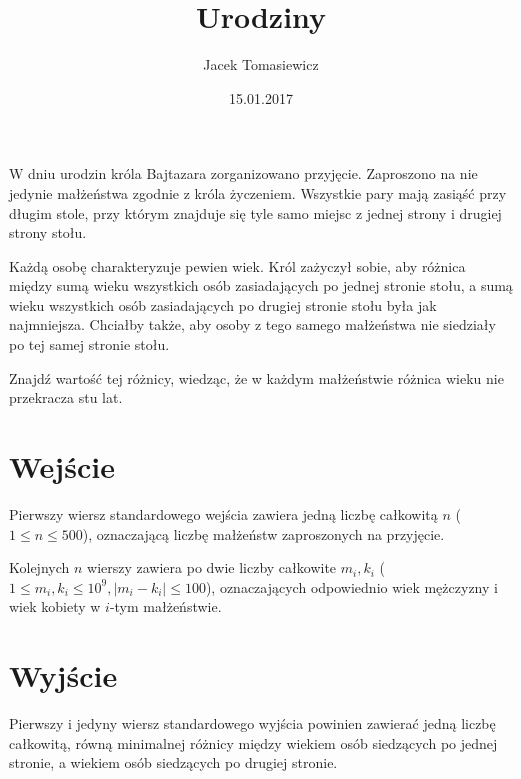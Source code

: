 \documentclass[zad,zawodnik, utf8]{sinol}
\title{Urodziny}
\author{Jacek Tomasiewicz}
\date{15.01.2017}
\begin{document}
  \begin{tasktext}%
W dniu urodzin króla Bajtazara zorganizowano przyjęcie. Zaproszono na nie jedynie małżeństwa zgodnie z króla życzeniem. Wszystkie pary mają zasiąść przy długim stole, przy którym znajduje się tyle samo miejsc z jednej strony i drugiej strony stołu. 

Każdą osobę charakteryzuje pewien wiek. Król zażyczył sobie, aby różnica między sumą wieku wszystkich osób zasiadających po jednej stronie stołu, a sumą wieku wszystkich osób zasiadających po drugiej stronie stołu była jak najmniejsza. Chciałby także, aby osoby z tego samego małżeństwa nie siedziały po tej samej stronie stołu. 

Znajdź wartość tej różnicy, wiedząc, że w każdym małżeństwie różnica wieku nie przekracza stu lat. 

  \section{Wejście}
Pierwszy wiersz standardowego wejścia zawiera jedną liczbę całkowitą $n$ ($1 \leq n \leq 500$), oznaczającą liczbę małżeństw zaproszonych na przyjęcie. 

Kolejnych $n$ wierszy zawiera po dwie liczby całkowite $m_i, k_i$ ($1\leq m_i, k_i \leq 10^9, |m_i-k_i| \leq 100$), oznaczających odpowiednio wiek mężczyzny i wiek kobiety w $i$-tym małżeństwie.

  \section{Wyjście}
	
Pierwszy i jedyny wiersz standardowego wyjścia powinien zawierać jedną liczbę całkowitą, równą minimalnej różnicy między wiekiem osób siedzących po jednej stronie, a wiekiem osób siedzących po drugiej stronie.

     \makecompactexample


  \end{tasktext}
\end{document}
